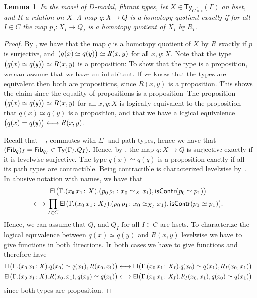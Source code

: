 \documentclass[10pt,a4paper]{article}
\newtheorem{lemma}{Lemma}[section]
\newcommand\Ty{\mathsf{Ty}}
\newcommand\El{\mathsf{El}}
\DeclarePairedDelimiter\paren{(}{)}
\newcommand\Fib{\mathsf{Fib}}
\newcommand\isContr{\mathsf{isContr}}
\begin{document}
\begin{lemma}\label{prop:homotopy-quotients-are-levelwise}
  In the model of $D$-modal, fibrant types, let $X \in \Ty_{\widehat{C \times \square}}(\Gamma)$ an hset, and $R$ a relation on $X$.
  A map $q \colon X \to Q$ is a homotopy quotient exactly if for all $I \in C$ the map $p_I \colon X_I \to Q_I$ is a homotopy quotient of $X_I$ by $R_I$.
\end{lemma}
\begin{proof}
  By \cite[Theorem 18.2.3]{rijke2025intro}, we have that the map $q$ is a homotopy quotient of $X$ by $R$ exactly if $p$ is surjective, and $\paren[\big]{q(x) \simeq q(y)} \simeq R(x, y)$ for all $x, y \colon X$.
  Note that the type $\paren[\big]{q(x) \simeq q(y)} \simeq R(x, y)$ is a proposition:
  To show that the type is a proposition, we can assume that we have an inhabitant.
  If we know that the types are equivalent then both are propositions, since $R(x, y)$ is a proposition.
  This shows the claim since the equality of propositions is a proposition.
  The proposition $\paren[\big]{q(x) \simeq q(y)} \simeq R(x, y)$ for all $x, y \colon X$ is logically equivalent to the proposition that $q(x) \simeq q(y)$ is a proposition, and that we have a logical equivalence $\paren[\big]{q(x) = q(y)} \longleftrightarrow R(x,y)$.

  Recall that $-_I$ commutes with $\Sigma$- and path types, hence we have that $\paren{\Fib_{q}}_I = \Fib_{q_I} \in \Ty(\Gamma_I.Q_I)$.
  Hence, by , the map $q \colon X \to Q$ is surjective exactly if it is levelwise surjective.
  The type $q(x) \simeq q(y)$ is a proposition exactly if all its path types are contractible. %
  Being contractible is characterized levelwise by~\cite[Proposition~16]{CRS21}.
  In abusive notation with names, we have that
  \begin{multline*}
    \El\paren[\big]{\Gamma.(x_0\,x_1\colon X).(p_0\,p_1\colon x_0 \simeq_X x_1), \isContr(p_0 \simeq p_1)} \\
    \longleftrightarrow \prod_{I \in C}
    \El\paren[\big]{\Gamma.(x_0\,x_1\colon X_I).(p_0\,p_1\colon x_0 \simeq_{X_I} x_1), \isContr(p_0 \simeq p_1)}.
  \end{multline*}
  Hence, we can assume that $Q$, and $Q_I$ for all $I \in C$ are hsets.
  To characterize the logical equivalence between $q(x) \simeq q(y)$ and $R(x, y)$ levelwise we have to give functions in both directions.
  In both cases we have to give functions and therefore have
  \begin{align*}
    \El\paren[\big]{ \Gamma.(x_0\,x_1\colon X).q(x_0) \simeq q(x_1) , R(x_0, x_1) } \longleftrightarrow \El\paren[\big]{ \Gamma.(x_0\,x_1\colon X_I).q(x_0) \simeq q(x_1) , R_I(x_0, x_1) } \\
    \El\paren[\big]{ \Gamma.(x_0\,x_1\colon X).R(x_0, x_1), q(x_0) \simeq q(x_1) } \longleftrightarrow \El\paren[\big]{ \Gamma.(x_0\,x_1\colon X_I).R_I(x_0, x_1), q(x_0) \simeq q(x_1) }
  \end{align*}
  since both types are proposition.
\end{proof}
\end{document}
